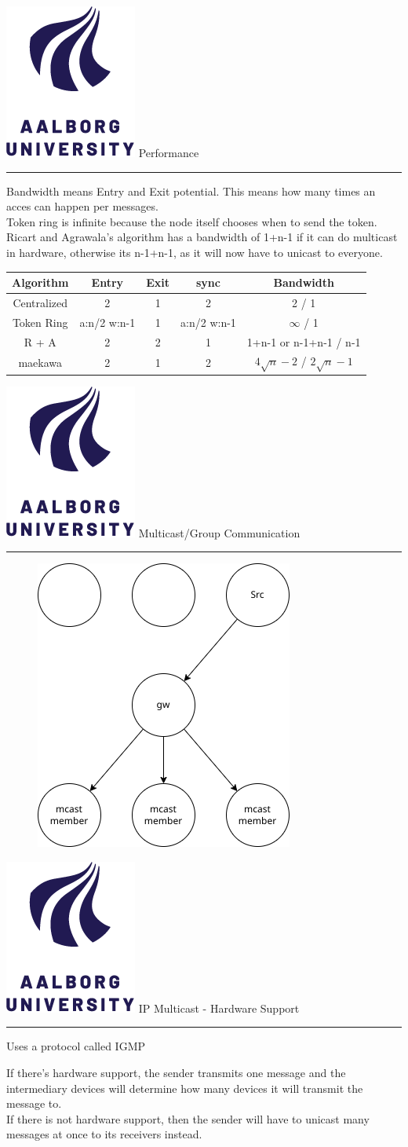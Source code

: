 \documentclass[aspectratio=1610,17pt,utf8]{beamer}
\newcommand{\mainframe}[1]{\color{blue} \includegraphics[width=.05\textwidth]{figures/aau.png} #1\\\color{black}\hrule}
\newcommand{\regularframe}[1]{\color{black}\includegraphics[width=.05\textwidth]{figures/aau.png} #1\\\hrule}
\begin{document}
\begin{frame}{\regularframe{Performance}}
    Bandwidth means Entry and Exit potential. This means how many times an acces can happen per messages.\\
    Token ring is infinite because the node itself chooses when to send the token.\\
    Ricart and Agrawala's algorithm has a bandwidth of 1+n-1 if it can do multicast in hardware, otherwise its n-1+n-1, as it will now have to unicast to everyone.
    \tiny{\begin{table}
        \begin{tabular}{|c|c|c|c|c|}
            \hline
            Algorithm & Entry & Exit & sync & Bandwidth \\\hline
            Centralized & 2 & 1 & 2 & 2 / 1 \\\hline
            Token Ring & a:n/2 w:n-1 & 1 & a:n/2 w:n-1 & $\infty$ / 1 \\\hline
            R + A & 2 & 2 & 1 & 1+n-1 or n-1+n-1 / n-1 \\\hline
            maekawa & 2 & 1 & 2 & $4 \sqrt{n}-2$ / $2 \sqrt{n}-1$ \\\hline
        \end{tabular}
    \end{table}}
\end{frame}

\begin{frame}{\mainframe{Multicast/Group Communication}}

    \begin{figure}
        \includegraphics[height=.4\textwidth]{figures/multicast-general.drawio.png}
    \end{figure}
\end{frame}

\begin{frame}{\regularframe{IP Multicast - Hardware Support}}
    Uses a protocol called IGMP

    If there's hardware support, the sender transmits one message and the intermediary devices will determine how many devices it will transmit the message to.\\
    If there is not hardware support, then the sender will have to unicast many messages at once to its receivers instead.
\end{frame}
\end{document}
